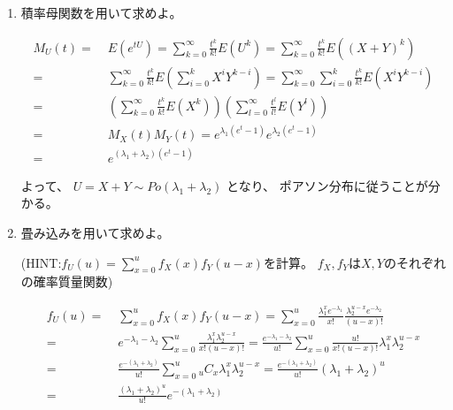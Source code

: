 \documentclass[12pt,b5paper]{ltjsarticle}
\begin{document}
\begin{enumerate}
      \hrulefill

      \begin{enumerate}
       \item
            積率母関数を用いて求めよ。

            \dotfill

            \begin{align}
             M_{U}(t)
             =&\; E(e^{tU})
             = \sum_{k=0}^{\infty} \frac{t^{k}}{k!} E(U^{k})
             = \sum_{k=0}^{\infty} \frac{t^{k}}{k!} E((X+Y)^{k})\\
             =&\; \sum_{k=0}^{\infty} \frac{t^{k}}{k!} E\left(\sum_{i=0}^{k}X^{i}Y^{k-i}\right)
             = \sum_{k=0}^{\infty} \sum_{i=0}^{k} \frac{t^{k}}{k!} E(X^{i}Y^{k-i})\\
             =&\; \left(\sum_{k=0}^{\infty} \frac{t^{k}}{k!} E(X^{k})\right)
             \left(\sum_{l=0}^{\infty} \frac{t^{l}}{l!} E(Y^{l})\right)\\
             =&\; M_{X}(t) M_{Y}(t)
             = e^{\lambda_{1}(e^{t}-1)}e^{\lambda_{2}(e^{t}-1)}\\
             =&\; e^{(\lambda_{1}+\lambda_{2})(e^{t}-1)}
            \end{align}

            よって、
            $U=X+Y \sim Po(\lambda_{1}+\lambda_{2})$
            となり、
            ポアソン分布に従うことが分かる。

            \hrulefill

       \item
            畳み込みを用いて求めよ。

            (HINT:$f_{U}(u)=\sum_{x=0}^{u} f_{X}(x)f_{Y}(u-x)$を計算。
            $f_{X},f_{Y}$は$X,Y$のそれぞれの確率質量関数)

            \dotfill

            \begin{align}
             f_{U}(u)
             =&\; \sum_{x=0}^{u} f_{X}(x) f_{Y}(u-x)
             = \sum_{x=0}^{u}
             \frac{\lambda_{1}^{x}e^{-\lambda_{1}}}{x!}
             \frac{\lambda_{2}^{u-x}e^{-\lambda_{2}}}{(u-x)!}\\
             =&\; e^{-\lambda_{1}-\lambda_{2}}
             \sum_{x=0}^{u} \frac{\lambda_{1}^{x} \lambda_{2}^{u-x}}{x!(u-x)!}
             = \frac{e^{-\lambda_{1}-\lambda_{2}}}{u!}
             \sum_{x=0}^{u} \frac{u!}{x!(u-x)!}\lambda_{1}^{x} \lambda_{2}^{u-x}\\
             =&\; \frac{e^{-(\lambda_{1}+\lambda_{2})}}{u!}
             \sum_{x=0}^{u} {}_{u}C_{x} \lambda_{1}^{x} \lambda_{2}^{u-x}
             = \frac{e^{-(\lambda_{1}+\lambda_{2})}}{u!}
             (\lambda_{1}+\lambda_{2})^{u}\\
             =&\; \frac{(\lambda_{1}+\lambda_{2})^{u}}{u!}e^{-(\lambda_{1}+\lambda_{2})}
            \end{align}


\end{enumerate}
\end{enumerate}
\end{document}
